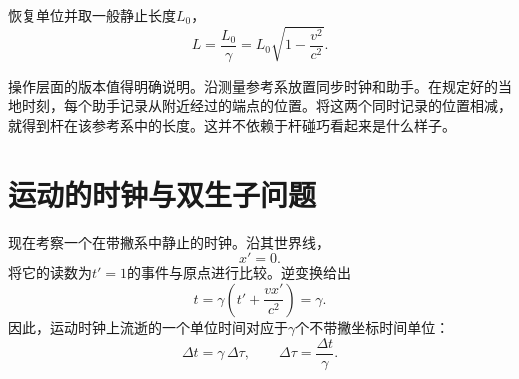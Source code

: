 恢复单位并取一般静止长度\(L_0\)，
\begin{equation}
L=\frac{L_0}{\gamma}
 =L_0\sqrt{1-\frac{v^2}{c^2}}.
\label{eq:sr1-length-contraction}
\end{equation}

\begin{classroomqa}
\end{classroomqa}

\begin{classroomqa}
\end{classroomqa}

操作层面的版本值得明确说明。沿测量参考系放置同步时钟和助手。在规定好的当地时刻，每个助手记录从附近经过的端点的位置。将这两个同时记录的位置相减，就得到杆在该参考系中的长度。这并不依赖于杆碰巧看起来是什么样子。

\begin{classroomqa}
\end{classroomqa}

\section{运动的时钟与双生子问题}

现在考察一个在带撇系中静止的时钟。沿其世界线，
\begin{equation}
x'=0.
\end{equation}
将它的读数为\(t'=1\)的事件与原点进行比较。逆变换给出
\begin{equation}
t=\gamma\left(t'+\frac{vx'}{c^2}\right)=\gamma.
\end{equation}
因此，运动时钟上流逝的一个单位时间对应于\(\gamma\)个不带撇坐标时间单位：
\begin{equation}
\Delta t=\gamma\,\Delta\tau,
\qquad
\Delta\tau=\frac{\Delta t}{\gamma}.
\label{eq:sr1-time-dilation}
\end{equation}

